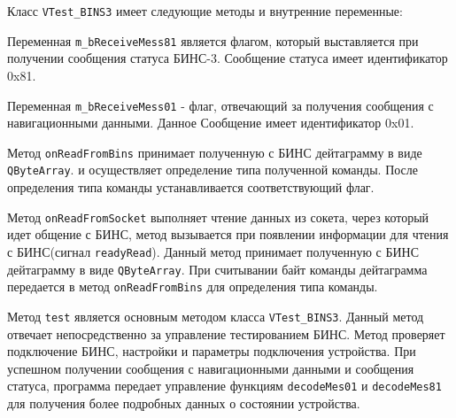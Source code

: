 Класс \texttt{VTest\_BINS3} имеет следующие методы и внутренние переменные:
\begin{enum}
	\item Переменная \texttt{m\_bReceiveMess81} является флагом, который выставляется при получении сообщения
		статуса БИНС-3. Сообщение статуса имеет идентификатор 0x81.

	\item Переменная \texttt{m\_bReceiveMess01} - флаг, отвечающий за получения сообщения с навигационными данными.
		Данное Сообщение имеет идентификатор 0x01.

	\item Метод \texttt{onReadFromBins} принимает полученную с БИНС дейтаграмму в виде \texttt{QByteArray}.
		и осуществляет определение типа полученной команды. После определения типа команды устанавливается
		соответствующий флаг.

	\item Метод \texttt{onReadFromSocket} выполняет чтение данных из сокета, через который идет общение с БИНС,
		метод вызывается при появлении информации для чтения с БИНС(сигнал \texttt{readyRead}).
		Данный метод принимает полученную с БИНС дейтаграмму в виде \texttt{QByteArray}.
		При считывании байт команды дейтаграмма передается в метод \texttt{onReadFromBins} для определения типа
		команды.

	\item Метод \texttt{test} является основным методом класса \texttt{VTest\_BINS3}. Данный метод отвечает
		непосредственно за управление тестированием БИНС. Метод проверяет подключение БИНС, настройки и
		параметры подключения устройства. При успешном получении сообщения с навигационными данными и сообщения
		статуса, программа передает управление функциям \texttt{decodeMes01} и \texttt{decodeMes81} для
		получения более подробных данных о состоянии устройства.


\end{enum}
